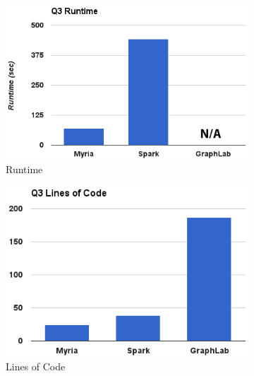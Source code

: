 \begin{figure}[t]
    \centering
    \begin{subfigure}{0.7\linewidth}
      \includegraphics[width=\textwidth]{images/q3_runtime.png}
        \caption{Runtime}
        \label{fig:q3_runtime}
    \end{subfigure}
    \vspace{10pt}
    \begin{subfigure}{0.7\linewidth}

      \includegraphics[width=\textwidth]{images/q3_loc.png}
      
        \caption{Lines of Code}
        \label{fig:q3_loc}
    \end{subfigure}
    \vspace{10pt}
        \begin{subfigure}{0.7\linewidth}


\end{subfigure}
\end{figure}
